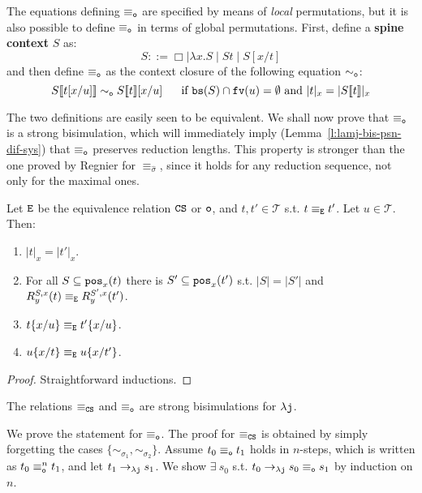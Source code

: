 \documentclass{LMCS}
\renewcommand{\>}{\rightarrow}
\def\lam{\lambda}
\def\sig{\sigma}
\newcommand{\Rew}[1]{\rightarrow_{#1}}
\newcommand{\isubs}[1]{ \{ #1  \} }
\newcommand{\pos}[2]{{\tt pos}_{#1}(#2)}
\newcommand{\ttE}{{\tt E}}
\newcommand{\dis}{{\tt j}}
\newcommand{\ldis}{\lam{\dis}}
\newcommand{\ren}[4]{R^{#2, #3}_{#4}(#1)}
\newcommand{\fv}[1]{{\tt fv}(#1)}
\newcommand{\CS}{{\tt CS}}
\newcommand{\set}[1]{ \{ #1 \}}
\newcommand{\terms}{\mathcal{T}}
\newcommand{\deft}[1]{{\bf #1}}
\newcommand{\eqw}[1]{\equiv_{#1}}
\newcommand{\eqo}{\equiv_\osym}
\def\rsig{\hat{\sigma}}
\newcommand{\osym}{{\tt o}}
\newcommand{\osymb}{{\tt o}}
\newcommand{\ctx}[2]{#1 [ \! [#2] \! ]}
\newcommand{\bs}[1]{{\tt bs}(#1)}
\newcommand{\eqcs}{\equiv_\CS}
\newcommand{\hole}{\Box}
\begin{document}
The equations defining $\eqo$ are specified by 
means of \textit{local}
permutations, but it is 
also possible to define
$\eqo$ in terms of global permutations. First, define 
a \deft{spine context} $S$ as:
\[ S  ::= \hole  \mid \lam x. S \mid S t \mid S[x/t]\]
and then define $\eqo$ as the context closure of the following equation $\sim_\osym$:
\[\ctx{S}{t[x/u]}\sim_\osym \ctx{S}{t}[x/u] \ \ \ \ \  \mbox{if $\bs{S}\cap \fv{u}=\emptyset$ and $|t|_x=|\ctx{S}{t}|_x$}\]

The two definitions are easily seen to be equivalent.  We shall now
prove that $\eqo$ is a strong bisimulation, which will immediately
imply (Lemma~\ref{l:lamj-bis-psn-dif-sys}) that $\eqo$ preserves
reduction lengths. This property is stronger than the one proved by
Regnier for $\eqw{\rsig}$, since it holds for any reduction sequence,
not only for the maximal ones.  \medskip

\begin{lem}
\label{l:eqo-stability}
Let $\ttE$ be the equivalence relation $\CS$ or $\osymb$, and $t,t'\in\terms$ s.t. $t \eqw{\ttE} t'$. Let $u \in \terms$. Then:
\begin{enumerate}[\rm(1)]
  \item \label{l:eqo-stability-minus} $|t|_x  = |t'|_x$.
  \item \label{l:eqo-stability-zero} For all $S \subseteq \pos{x}{t}$ 
  there is 
  $S' \subseteq \pos{x}{t'}$ s.t.
  $|S| = |S'|$ and  
  $\ren{t}{S}{x}{y}  \eqw{\ttE} \ren{t'}{S'}{x}{y}$. 
  \item \label{l:eqo-stability-two}  $t\isubs{x/u} \eqw{\ttE} t'\isubs{x/u}$.
  \item \label{l:eqo-stability-one}  $u\isubs{x/t} \eqw{\ttE} u\isubs{x/t'}$.
  \end{enumerate}      
 \end{lem}

\begin{proof}
 Straightforward inductions.
\end{proof}



\begin{lem}
\label{l:eqo-bisim}
The relations $\eqcs$ and $\eqo$ are   strong bisimulations for $\ldis$. 
\end{lem}




\proof
We prove the statement for $\eqo$. The proof for $\eqcs$ is obtained by 
simply forgetting the cases $\set{ \sim_{\sig_1}, \sim_{\sig_2}}$.
Assume $t_0 \eqo t_1$ holds in $n$-steps, which is written as
$t_0\eqo^n t_1$, and let $t_1\Rew{\ldis} s_1$. We show $\exists\ s_0$
s.t.  $t_0\Rew{\ldis} s_0 \eqo s_1$  by induction on
$n$.  
\end{document}
